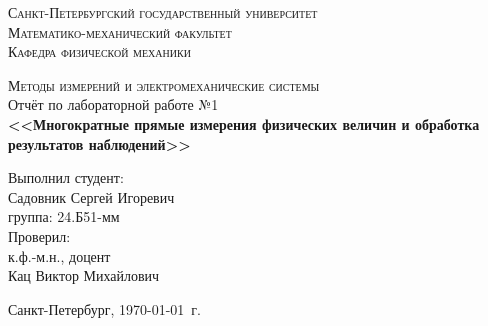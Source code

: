 \begin{titlepage}
\begin{center}
\textsc{Санкт-Петербургский государственный университет\\
Математико-механический факультет\\
Кафедра физической механики\\}

\vfill

\textsc{Методы измерений и электромеханические системы\\[3mm]}
Отчёт по лабораторной работе №1\\[6mm]


\textbf{\large<<Многократные прямые измерения физических величин и
обработка результатов наблюдений>>}

\vfill
\end{center}

\hfill
\begin{minipage}{.5\textwidth}
Выполнил студент:\\[2mm] 
Садовник Сергей Игоревич\\
группа: 24.Б51-мм\\[5mm]

Проверил:\\[2mm] 
к.ф.-м.н., доцент\\
Кац Виктор Михайлович
\end{minipage}%
\vfill
\begin{center}
 Санкт-Петербург, \yeardate\today\ г.
\end{center}
\end{titlepage}